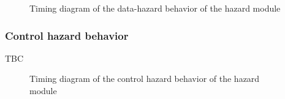 \begin{figure}[H]
    \centering
    
    \caption{Timing diagram of the data-hazard behavior of the hazard module}
    \label{fig:hzdm-behavior-data-hazard}
\end{figure}

\subsubsection{Control hazard behavior}

\begin{content}
  TBC
\end{content}

\begin{figure}[H]
    \centering
    
    \caption{Timing diagram of the control hazard behavior of the hazard module}
    \label{fig:hzdm-behavior-control-hazard}
\end{figure}

\newpage